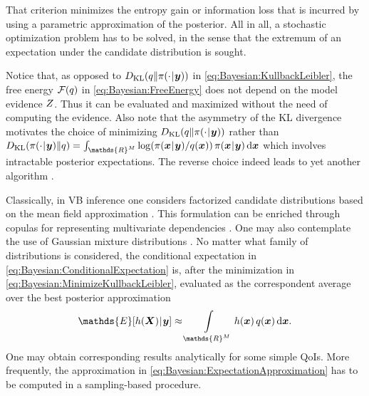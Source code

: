 That criterion minimizes the entropy gain or information loss that is incurred by using a parametric approximation of the posterior.
All in all, a stochastic optimization problem has to be solved, in the sense that the extremum of an expectation under the candidate distribution is sought.
\par %
Notice that, as opposed to \(D_{\mathrm{KL}}(q \| \pi(\cdot {\:\!}|{\:\!} \bm{y}))\) in \cref{eq:Bayesian:KullbackLeibler},
the free energy \(\mathcal{F}(q)\) in \cref{eq:Bayesian:FreeEnergy} does not depend on the model evidence \(Z\).
Thus it can be evaluated and maximized without the need of computing the evidence.
Also note that the asymmetry of the KL divergence motivates the choice of minimizing
\(D_{\mathrm{KL}}(q \| \pi(\cdot {\:\!}|{\:\!} \bm{y}))\) rather than \(D_{\mathrm{KL}}(\pi(\cdot \cond \bm{y})\| \varapprox)
= \int_{\mathds{R}^\dimParam} \log(\pi(\bm{x} \cond \bm{y}) / \varapprox(\bm{x})) \, \pi(\bm{x} \cond \bm{y}) \, \mathrm{d} \bm{x}\)
which involves intractable posterior expectations.
The reverse choice indeed leads to yet another algorithm \cite{Bayesian:Minka2001}.
\par %
Classically, in VB inference one considers factorized candidate distributions based on the mean field approximation \cite{Bayesian:Opper2001}.
This formulation can be enriched through copulas for representing multivariate dependencies \cite{Bayesian:Tran2015,Bayesian:Han2016}.
One may also contemplate the use of Gaussian mixture distributions \cite{Bayesian:Zobay2014,Bayesian:Tsilifis2016}.
No matter what family of distributions is considered, the conditional expectation in \cref{eq:Bayesian:ConditionalExpectation} is,
after the minimization in \cref{eq:Bayesian:MinimizeKullbackLeibler}, evaluated as the correspondent average over the best posterior approximation
\begin{equation} \label{eq:Bayesian:ExpectationApproximation}
  \mathds{E}[h(\bm{X}) \cond \bm{y}] \approx \int\limits_{\mathds{R}^\dimParam} h(\bm{x}) \, \varapprox(\bm{x}) \, \mathrm{d} \bm{x}.
\end{equation}
One may obtain corresponding results analytically for some simple QoIs.
More frequently, the approximation in \cref{eq:Bayesian:ExpectationApproximation} has to be computed in a sampling-based procedure.

